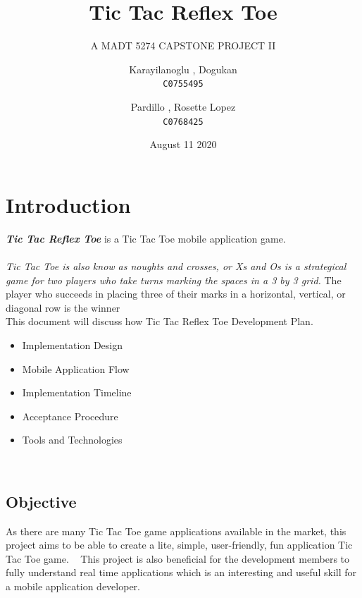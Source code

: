 \documentclass{scrartcl}
\title{Tic Tac Reflex Toe}
\subtitle{A MADT 5274 CAPSTONE PROJECT II}
\author{
  Karayilanoglu , Dogukan \\ \texttt{C0755495}
  \and
  Pardillo , Rosette Lopez \\ \texttt{C0768425}
}
\date{August 11 2020}
\begin{document}
\maketitle

\begin{abstract}
\end{abstract}
\newpage
\tableofcontents
\newpage





\section{Introduction}
    \textbf{\emph{Tic Tac Reflex Toe}} is a Tic Tac Toe mobile application game.
    \\\\
    \textit{Tic Tac Toe \emph{is also know as noughts and crosses, or Xs and Os is a strategical game for two players who take turns marking the spaces in a 3 by 3 grid.}}
    The player who succeeds in placing three of their marks in a horizontal, vertical, or diagonal row is the winner
    \\
    This document will discuss how Tic Tac Reflex Toe Development Plan.  
    
    \begin{itemize}
    	\item Implementation Design
    	\item Mobile Application Flow
    	\item Implementation Timeline
    	\item Acceptance Procedure
    	\item Tools and Technologies
    \end{itemize}
    ~\newline
    
    \subsection{Objective}
        As there are many Tic Tac Toe game applications available in the market, this project aims to be able to create a lite, simple, user-friendly, fun application Tic Tac Toe game.
        ~\newline
        This project is also beneficial for the development members to fully understand real time applications which is an interesting and useful skill for a mobile application developer.
   ~\newline
\end{document}
